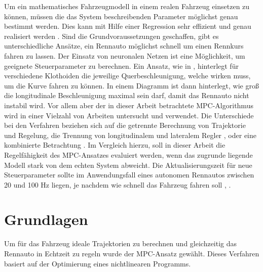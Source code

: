 \documentclass{like}
\begin{document}
Um ein mathematisches Fahrzeugmodell in einem realen Fahrzeug einsetzen zu können, müssen die das System beschreibenden Parameter möglichst genau bestimmt werden. Dies kann mit Hilfe einer Regression sehr effizient und genau realisiert werden \cite{Williams2016AggressiveDW}.  
\newline
Sind die Grundvoraussetzungen geschaffen, gibt es unterschiedliche Ansätze, ein Rennauto möglichst schnell um einen Rennkurs fahren zu lassen. Der Einsatz von neuronalen Netzen \cite{6374146} ist eine Möglichkeit, um geeignete Steuerparameter zu berechnen. 
Ein Ansatz, wie in \cite{KRITAYAKIRANA2010548}, hinterlegt für verschiedene Klothoiden die jeweilige Querbeschleunigung, welche wirken muss, um die Kurve fahren zu können. In einem Diagramm ist dann hinterlegt, wie groß die longitudinale Beschleunigung maximal sein darf, damit das Rennauto nicht instabil wird. Vor allem aber der in dieser Arbeit betrachtete \ac{MPC}-Algorithmus wird in einer Vielzahl von Arbeiten untersucht und verwendet. 
Die Unterschiede bei den Verfahren beziehen sich auf die getrennte Berechnung von Trajektorie und Regelung, die Trennung von longitudinalem und lateralem Regler \cite{MPC_Dynamic}, \cite{MPC_Dynamic_Tire_Model} oder eine kombinierte Betrachtung \cite{rc_car_1_43}. Im Vergleich hierzu, soll in dieser Arbeit die Regelfähigkeit des \ac{MPC}-Ansatzes evaluiert werden, wenn das zugrunde liegende Modell stark von dem echten System abweicht.
\newline
Die Aktualisierungszeit für neue Steuerparameter sollte im Anwendungsfall eines autonomen Rennautos zwischen 20 und 100 Hz liegen, je nachdem wie schnell das Fahrzeug fahren soll \cite{rc_car_1_43}, \cite{Williams2016AggressiveDW}.


\chapter{Grundlagen}
Um für das Fahrzeug ideale Trajektorien zu berechnen und gleichzeitig das Rennauto in Echtzeit zu regeln wurde der \ac{MPC}-Ansatz gewählt. Dieses Verfahren basiert auf der Optimierung eines nichtlinearen Programms.
 
\end{document}
